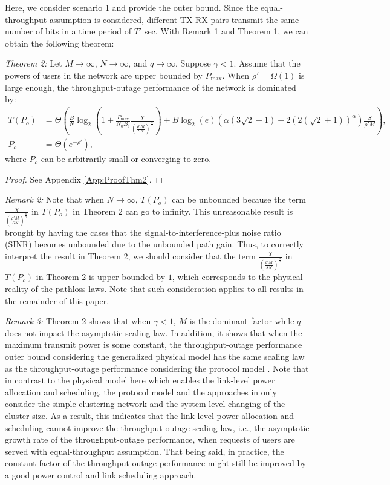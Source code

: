 \documentclass[journal,draftclsnofoot,onecolumn,12pt,twoside]{IEEEtran}
\begin{document}
Here, we consider scenario 1 and provide the outer bound. Since the equal-throughput assumption is considered, different TX-RX pairs transmit the same number of bits in a time period of $T'$ sec. With Remark 1 and Theorem 1, we can obtain the following theorem:

{\em Theorem 2:} Let $M\to\infty$, $N\to\infty$, and $q\to\infty$. Suppose $\gamma<1$. Assume that the powers of users in the network are upper bounded by $P_{\text{max}}$. When $\rho'=\Omega(1)$ is large enough, the throughput-outage performance of the network is dominated by:
\begin{equation}
\begin{aligned}
T(P_o)&= \Theta\left(\frac{B}{N}\log_2\left(1+\frac{P_{\text{max}}}{N_0B_{\text{s}}}\frac{\chi}{\left(\frac{\rho'M}{SN}\right)^\frac{\alpha}{2}}\right)+B\log_2(e)\left(\alpha\left(3\sqrt{2}+1\right)+2(2(\sqrt{2}+1))^{\alpha}\right)\frac{S}{\rho'M}\right),\\
P_o&= \Theta\left(e^{-\rho'}\right),
\end{aligned}
\end{equation}
where $P_o$ can be arbitrarily small or converging to zero.
\begin{proof}
See Appendix \ref{App:ProofThm2}.
\end{proof}

{\em Remark 2:} Note that when $N\to\infty$, $T(P_o)$ can be unbounded because the term $\frac{\chi}{\left(\frac{\rho'M}{SN}\right)^\frac{\alpha}{2}}$ in $T(P_o)$ in Theorem 2 can go to infinity. This unreasonable result is brought by having the cases that the signal-to-interference-plus noise ratio (SINR) becomes unbounded due to the unbounded path gain. Thus, to correctly interpret the result in Theorem 2, we should consider that the term $\frac{\chi}{\left(\frac{\rho'M}{SN}\right)^\frac{\alpha}{2}}$ in $T(P_o)$ in Theorem 2 is upper bounded by $1$, which corresponds to the physical reality of the pathloss laws. Note that such consideration applies to all results in the remainder of this paper.

{\em Remark 3:} Theorem 2 shows that when $\gamma<1$, $M$ is the dominant factor while $q$ does not impact the asymptotic scaling law. In addition, it shows that when the maximum transmit power is some constant, the throughput-outage performance outer bound considering the generalized physical model has the same scaling law as the throughput-outage performance considering the protocol model \cite{Ji:Th_Out_toff,lee2019throughput}. Note that in contrast to the physical model here which enables the link-level power allocation and scheduling, the protocol model and the approaches in \cite{Ji:Th_Out_toff,lee2019throughput} only consider the simple clustering network and the system-level changing of the cluster size. As a result, this indicates that the link-level power allocation and scheduling cannot improve the throughput-outage scaling law, i.e., the asymptotic growth rate of the throughput-outage performance, when requests of users are served with equal-throughput assumption. That being said, in practice, the constant factor of the throughput-outage performance might still be improved by a good power control and link scheduling approach.
\end{document}
